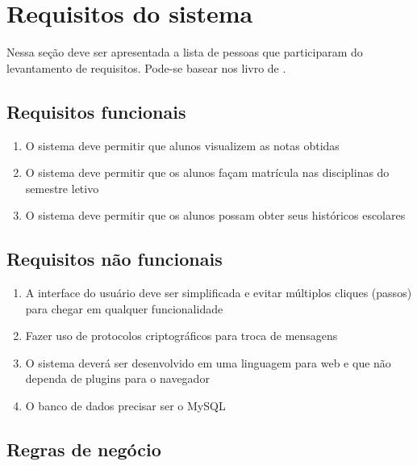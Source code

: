 \documentclass[11pt]{classes/ifscarticle}
\begin{document}
\section{Requisitos do sistema}
\label{sec:requisitos}

Nessa seção deve ser apresentada a lista de pessoas que participaram do levantamento de requisitos. Pode-se basear nos livro de \cite{bezerra02}.

\lipsum[2]


\subsection{Requisitos funcionais}
\label{sec:reqfuncionais}

\begin{enumerate}
    \item O sistema deve permitir que alunos visualizem as notas obtidas
    \item O sistema deve permitir que os alunos façam matrícula nas disciplinas do semestre letivo
    \item O sistema deve permitir que os alunos possam obter seus históricos escolares
\end{enumerate}

\subsection{Requisitos não funcionais}
\label{sec:reqnaofuncionais}

\begin{enumerate}
    \item A interface do usuário deve ser simplificada e evitar múltiplos cliques (passos) para chegar em qualquer funcionalidade
    \item Fazer uso de protocolos criptográficos para troca de mensagens
    \item O sistema deverá ser desenvolvido em uma linguagem para web e que não dependa de plugins para o navegador
    \item O banco de dados precisar ser o MySQL
\end{enumerate}

\subsection{Regras de negócio}
\label{sec:regrasdenegocio}
\end{document}
